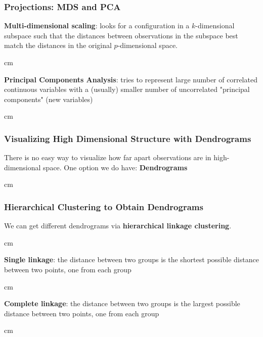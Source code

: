 \documentclass{beamer} %
\begin{document}
\begin{frame}\frametitle{Projections:  MDS and PCA}
	\small
	
	\textbf{Multi-dimensional scaling}:  looks for a configuration in a $k$-dimensional subspace such that the distances between observations in the subspace best match the distances in the original $p$-dimensional space.
	
	 cm
	
	\textbf{Principal Components Analysis}:  tries to represent large number of correlated continuous variables with a (usually) smaller number of uncorrelated "principal components" (new variables)
	
	 cm
	
	
\end{frame}



\begin{frame}\frametitle{Visualizing High Dimensional Structure with Dendrograms}
	\small
	\centering
	
	There is no easy way to visualize how far apart observations are in high-dimensional space.  One option we do have:  \textbf{Dendrograms}
	
	 cm
	
	
\end{frame}




\begin{frame}\frametitle{Hierarchical Clustering to Obtain Dendrograms}
	\small
	
	We can get different dendrograms via \textbf{hierarchical linkage clustering}.
	
	 cm
	
	\textbf{Single linkage}:  the distance between two groups is the shortest possible distance between two points, one from each group
	
	 cm
	
	\textbf{Complete linkage}:  the distance between two groups is the largest possible distance between two points, one from each group
	
	 cm
	
\end{frame}
\end{document}
